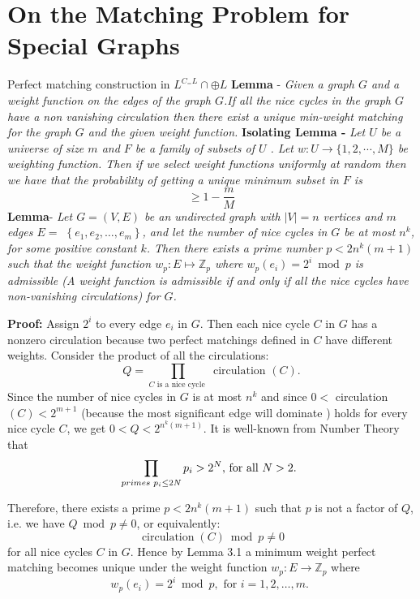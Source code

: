 \documentclass{beamer}
\begin{document}
\section{On the Matching Problem for Special Graphs}
\begin{frame}[allowframebreaks]{Perfect matching construction in $L^{C_=L} \cap \oplus L$}
	\textbf{Lemma} - \textit{Given a graph $G$ and a weight function on the edges of the graph $G$.If all the nice cycles in the graph $G$ have a non vanishing circulation then there exist a unique min-weight matching for the graph $G$ and the given weight function. } \break \break
	\textbf{Isolating Lemma -} \textit{Let $U$ be a universe of size $m$ and $F$ be a family of subsets of $U$ . Let $w: U \to \{1,2,\cdots,M\}$ be weighting function. Then if we select weight functions uniformly at random then we have that the probability of getting a unique minimum subset in $F$ is} $$\geq 1-\frac{m}{M}$$
	\break
	\textbf{Lemma}- \textit{ Let $G=(V, E)$ be an undirected graph with $|V|=n$ vertices and $m$ edges $E=$ $\left\{e_1, e_2, \ldots, e_m\right\}$, and let the number of nice cycles in $G$ be at most $n^k$, for some positive constant $k$. Then there exists a prime number $p<2 n^k(m+1)$ such that the weight function $w_p: E \mapsto \mathbb{Z}_p$ where $w_p\left(e_i\right)=2^i \bmod p$ is admissible (A weight function is admissible if and only if all the nice cycles have non-vanishing circulations) for $G$.}
	
	\textbf{Proof:} Assign $2^i$ to every edge $e_i$ in $G$. Then each nice cycle $C$ in $G$ has a nonzero circulation because two perfect matchings defined in $C$ have different weights. Consider the product of all the circulations:
	$$
	Q=\prod_{C \text { is a nice cycle }} \text { circulation }(C) .
	$$
	Since the number of nice cycles in $G$ is at most $n^k$ and since $0<$ circulation $(C)<2^{m+1}$ (because the  most significant edge will dominate ) holds for every nice cycle $C$, we get $0<Q<2^{n^k(m+1)}$. It is well-known from Number Theory that
	$$
	\prod_{ primes \hspace{0.1cm} p_i \leq 2 N} p_i>2^N \text {, for all } N>2 \text {. }
	$$
	
	Therefore, there exists a prime $p<2 n^k(m+1)$ such that $p$ is not a factor of $Q$, i.e. we have $Q \bmod p \neq 0$, or equivalently:
	$$
	\operatorname{circulation}(C) \bmod p \neq 0
	$$
	for all nice cycles $C$ in $G$. Hence by Lemma 3.1 a minimum weight perfect matching becomes unique under the weight function $w_p: E \rightarrow \mathbb{Z}_p$ where
	$$
	w_p\left(e_i\right)=2^i \bmod p, \text { for } i=1,2, \ldots, m \text {. }
	$$
	

\end{frame}
\end{document}
